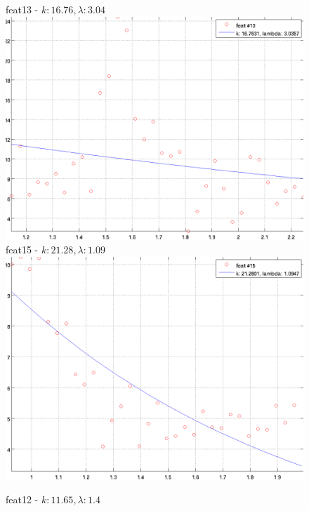 \documentclass[12pt]{report}
\begin{document}
\begin{figure}[H]
\begin{minipage}[t]{0.5\linewidth}
	feat13 - $k: 16.76, \lambda: 3.04 $\\
	\includegraphics[scale=\imFeat]{images/feat13}\\
	feat15 - $k: 21.28, \lambda: 1.09 $\\
	\includegraphics[scale=\imFeat]{images/feat15}\\
\end{minipage}
\begin{minipage}[t]{0.5\linewidth}
	\centering
	feat12 - $k: 11.65, \lambda: 1.4 $\\

\end{minipage}
\end{figure}
\end{document}
